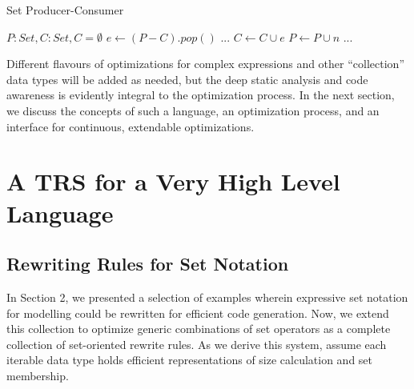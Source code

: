 \documentclass{article}
\begin{document}
\begin{algorithm}
  \caption{Set Producer-Consumer}
  \begin{algorithmic}
    \Require $P: Set, C: Set, C = \emptyset$
      \State $e \gets (P - C).pop()$
      ... 
      \State $C \gets C \cup {e}$
      \State $P \gets P \cup {n}$ ... 
    \EndWhile
  \end{algorithmic}
  \label{fig:prodcons}
\end{algorithm}

Different flavours of optimizations for complex expressions and other ``collection'' data types will be added as needed, but the deep static analysis and code awareness is evidently integral to the optimization process. In the next section, we discuss the concepts of such a language, an optimization process, and an interface for continuous, extendable optimizations.

\section{A TRS for a Very High Level Language}
\subsection{Rewriting Rules for Set Notation}

In Section 2, we presented a selection of examples wherein expressive set notation for modelling could be rewritten for efficient code generation. Now, we extend this collection to optimize generic combinations of set operators as a complete collection of set-oriented rewrite rules. As we derive this system, assume each iterable data type holds efficient representations of size calculation and set membership.


\end{document}
